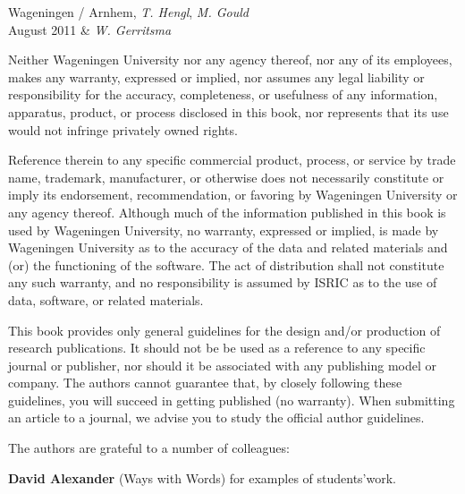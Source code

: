 \documentclass[graybox,envcountchap,sectrefs,UStrade]{svmono}
\begin{document}

\vspace{\baselineskip}
\begin{flushright}\noindent
Wageningen / Arnhem, \hfill \emph{T. Hengl}, \emph{M. Gould} \\
August 2011 \hfill \& \emph{W. Gerritsma} \\
\end{flushright}


Neither Wageningen University nor any agency thereof, nor any of its employees, makes any warranty, expressed or implied, nor assumes any legal liability or responsibility for the accuracy, completeness, or usefulness of any information, apparatus, product, or process disclosed in this book, nor represents that its use would not infringe privately owned rights. \par

Reference therein to any specific commercial product, process, or service by trade name, trademark, manufacturer, or otherwise does not necessarily constitute or imply its endorsement, recommendation, or favoring by Wageningen University or any agency thereof. Although much of the information published in this book is used by Wageningen University, no warranty, expressed or implied, is made by Wageningen University as to the accuracy of the data and related materials and (or) the functioning of the software. The act of distribution shall not constitute any such warranty, and no responsibility is assumed by ISRIC as to the use of data, software, or related materials.\par

This book provides only general guidelines for the design and/or production of research publications. It should not be be used as a reference to any specific journal or publisher, nor should it be associated with any publishing model or company. The authors cannot guarantee that, by closely following these guidelines, you will succeed in getting published (no warranty). When submitting an article to a journal, we advise you to study the official author guidelines. \par


The authors are grateful to a number of colleagues: \bigskip

\textbf{David Alexander} (Ways with Words) for examples of students'work.\par \bigskip
\end{document}
